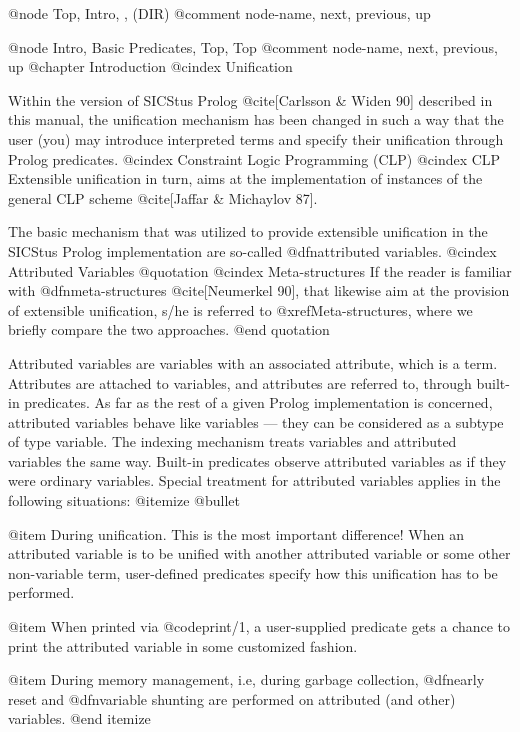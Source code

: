 @node Top,            Intro,         , (DIR)
@comment  node-name,  next,  previous,  up

@node Intro, Basic Predicates, Top, Top
@comment  node-name,  next,  previous,  up
@chapter Introduction
@cindex Unification

Within the version of SICStus Prolog @cite{[Carlsson & Widen 90]}
described in this manual, the unification mechanism has been changed in
such a way that the user (you) may introduce interpreted terms and
specify their unification through Prolog predicates.
@cindex Constraint Logic Programming (CLP)
@cindex CLP
Extensible unification in turn, aims at the implementation of instances
of the general CLP scheme @cite{[Jaffar & Michaylov 87]}.

The basic mechanism that was utilized to provide extensible unification
in the SICStus Prolog implementation are so-called @dfn{attributed
variables}.
@cindex Attributed Variables
@quotation
@cindex Meta-structures
If the reader is familiar with @dfn{meta-structures} @cite{[Neumerkel
90]}, that likewise aim at the provision of extensible unification, s/he
is referred to @xref{Meta-structures}, where we briefly compare the two
approaches.
@end quotation

Attributed variables are variables with an associated attribute, which
is a term.  Attributes are attached to variables, and attributes are
referred to, through built-in predicates. As far as the rest of a given
Prolog implementation is concerned, attributed variables behave like
variables --- they can be considered as a subtype of type variable. The
indexing mechanism treats variables and attributed variables the same
way.  Built-in predicates observe attributed variables as if they were
ordinary variables. Special treatment for attributed variables applies
in the following situations:
@itemize @bullet

@item 
During unification. This is the most important difference! When an attributed
variable is to be unified with another attributed variable or some
other non-variable term, user-defined predicates specify how this unification
has to be performed.

@item 
When printed via @code{print/1}, a user-supplied predicate gets a chance
to print the attributed variable in some customized fashion.

@item 
During memory management, i.e, during garbage collection, @dfn{early
reset} and @dfn{variable shunting} are performed on attributed (and
other) variables.
@end itemize

